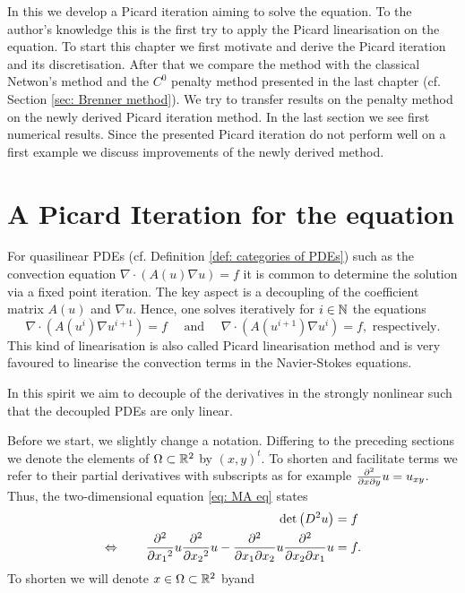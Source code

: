 In this we develop a Picard iteration aiming to solve the \MA equation. To the author's knowledge this is the first try to apply the Picard linearisation on the \MA equation. 
To start this chapter we first motivate and derive the Picard iteration and its discretisation.
After that we compare the method with the classical Netwon's method and the $C^0$ penalty method presented in the last chapter (cf. Section \ref{sec: Brenner method}). We try to transfer results on the penalty method on the newly derived Picard iteration method. 
In the last section we see first numerical results. Since the presented Picard iteration do not perform well on a first example we discuss improvements of the newly derived method.


\section{A Picard Iteration for the \MA equation} \label{sec: motivation picard iteration}
For quasilinear PDEs (cf. Definition \ref{def: categories of PDEs}) such as the convection equation $\nabla \cdot (A(u) \nabla u ) = f$ it is common to determine the solution via a fixed point iteration. The key aspect is a decoupling of the coefficient matrix $A(u)$ and $\nabla u$. Hence, one solves iteratively  for $i\in \mathbb{N}$ the equations
\[
	\nabla \cdot (A(u^{i} )\nabla u^{i+1}) = f   \quad \text{      and      }\quad \nabla \cdot (A(u^{i+1}) \nabla u^{i}) = f, \text{ respectively}.
\] 
This kind of linearisation is also called Picard linearisation method and is very favoured to linearise the convection terms in the Navier-Stokes equations.

In this spirit we aim to decouple of the derivatives in the strongly nonlinear \MA such that the decoupled PDEs are only linear. 

Before we start, we slightly change a notation. Differing to the preceding sections we denote the elements of $\Omega \subset \mathbb{R}^2$ by  $(x,y)^t$. To shorten and facilitate terms we refer to their partial derivatives with subscripts as for example $\frac {\partial^2} {\partial x\partial y} u = u_{xy}$.
Thus, the two-dimensional \MA equation \eqref{eq: MA eq} states
\begin{align}
 \det{\left(D^2 u\right)} &= f \nonumber \\
 	\Leftrightarrow \qquad  \frac {\partial^2} {\partial {x_1}^2} u \frac {\partial^2} {\partial {x_2}^2} u -\frac {\partial^2} {\partial x_1\partial x_2} u \frac {\partial^2} {\partial x_2\partial x_1} u  &= f. \label{eq:mongeAmpere detForm}
\end{align}
To shorten we will denote $x \in \Omega \subset {\mathbb{R}^2} $ byand 

